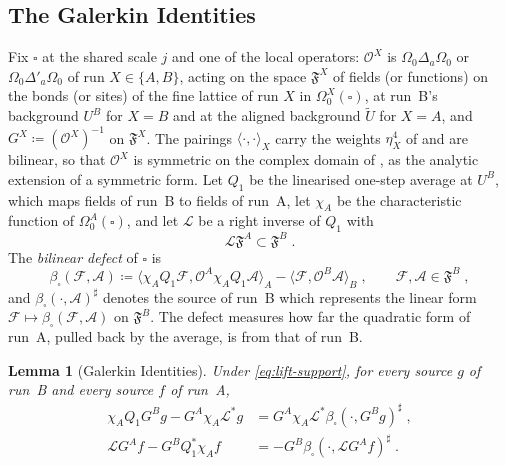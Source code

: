 \documentclass[11pt]{preprint}
\numberwithin{equation}{section}
\newtheorem{lemma}[theorem]{Lemma}
\theoremstyle{definition}
\theoremstyle{remark}
\theoremstyle{plain}
\begin{document}
\subsection{The Galerkin Identities}\label{sec:galerkin}

Fix $\square$ at the shared scale $j$ and one of the local operators: $\mathcal O^X$ is $\Omega_0\Delta_a\Omega_0$ or $\Omega_0\Delta'_a\Omega_0$ of run $X \in \{ A, B \}$, acting on the space $\mathfrak F^X$ of fields (or functions) on the bonds (or sites) of the fine lattice of run $X$ in $\Omega_0^X(\square)$, at run~B's background $U^B$ for $X = B$ and at the aligned background $\tilde U$ for $X = A$, and $G^X \coloneqq (\mathcal O^X)^{-1}$ on $\mathfrak F^X$. The pairings $\langle\cdot, \cdot\rangle_X$ carry the weights $\eta_X^4$ of \cite[p.~393]{BalabanPBG} and are bilinear, so that $\mathcal O^X$ is symmetric on the complex domain of \cite[(3.37)]{BalabanPBG}, as the analytic extension of a symmetric form. Let $Q_1$ be the linearised one-step average at $U^B$, which maps fields of run~B to fields of run~A, let $\chi_A$ be the characteristic function of $\Omega^A_0(\square)$, and let $\mathcal L$ be a right inverse of $Q_1$ with
\begin{equation}\label{eq:lift-support}
    \mathcal L\mathfrak F^A \subset \mathfrak F^B\;.
\end{equation}
The \emph{bilinear defect} of $\square$ is
\begin{equation}\label{eq:bilinear-defect}
    \beta_\square(\mathcal F, \mathcal A) \coloneqq \langle\chi_AQ_1\mathcal F, \mathcal O^A\chi_AQ_1\mathcal A\rangle_A - \langle\mathcal F, \mathcal O^B\mathcal A\rangle_B\;,
    \qquad \mathcal F, \mathcal A \in \mathfrak F^B\;,
\end{equation}
and $\beta_\square(\cdot, \mathcal A)^\sharp$ denotes the source of run~B which represents the linear form $\mathcal F \mapsto \beta_\square(\mathcal F, \mathcal A)$ on $\mathfrak F^B$. The defect measures how far the quadratic form of run~A, pulled back by the average, is from that of run~B.

\begin{lemma}[Galerkin Identities]\label{lem:galerkin}
Under \eqref{eq:lift-support}, for every source $g$ of run~B and every source $f$ of run~A,
\begin{align}
    \chi_AQ_1G^Bg - G^A\chi_A\mathcal L^*g &= G^A\chi_A\mathcal L^*\beta_\square(\cdot, G^Bg)^\sharp\;, \label{eq:galerkin-coarse}\\
    \mathcal LG^Af - G^BQ_1^*\chi_Af &= -G^B\beta_\square(\cdot, \mathcal LG^Af)^\sharp\;. \label{eq:galerkin-fine}
\end{align}
\end{lemma}
\end{document}
